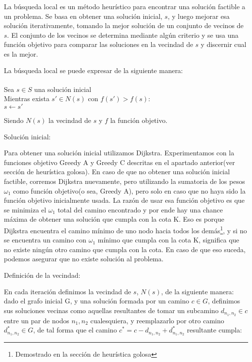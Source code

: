 
La búsqueda local es un método heurístico para encontrar una solución factible a un problema. Se basa en obtener una solución inicial, $s$, y luego mejorar esa solución iterativamente, tomando la mejor solución de un conjunto de vecinos de $s$. El conjunto de los vecinos se determina mediante algún criterio y se usa una función objetivo para comparar las soluciones en la vecindad de $s$ y discernir cual es la mejor.

La búsqueda local se puede expresar de la siguiente manera:\\\\
Sea $s \in S$ una solución inicial\\
Mientras exista $s' \in N(s)$ con $f(s') > f(s)$:\\
\hspace*{1 cm} $s \leftarrow s'$

Siendo $N(s)$ la vecindad de $s$ y $f$ la función objetivo.

Solución inicial:

Para obtener una solución inicial utilizamos Dijkstra. Experimentamos con la funciones objetivo Greedy A y Greedy C descritas en el apartado anterior(ver sección de heurística golosa). En caso de que no obtener una solución inicial factible, corremos Dijkstra nuevamente, pero utilizando la sumatoria de los pesos $\omega_1$ como función objetivo(o sea, Greedy A), pero solo en caso que no haya sido la función objetivo inicialmente usada. La razón de usar esa función objetivo es que se minimiza el $\omega_1$ total del camino encontrado y por ende hay una chance máxima de obtener una solución que cumpla con la cota K. Eso es porque Dijkstra encuentra el camino mínimo de uno nodo hacia todos los demás\footnote{Demostrado en la sección de heurística golosa}, y si no se encuentra un camino con $\omega_1$ mínimo que cumpla con la cota K, significa que no existe ningún otro camino que cumpla con la cota. En caso de que eso suceda, podemos asegurar que no existe solución al problema.

Definición de la vecindad:

En cada iteración definimos la vecindad de $s$, $N(s)$, de la siguiente manera: dado el grafo inicial G, y una solución formada por un camino $c \in G$, definimos sus soluciones vecinas como aquellas resultantes de tomar un subcamino $d_{n_1,n_2} \in c$ entre un par de nodos $n_1,n_2$ cualesquiera, y reemplazarlo por otro camino $d_{n_1,n_2}^* \in G$, de tal forma que el camino $c^* = c - d_{n_1,n_2} + d_{n_1,n_2}^*$ resultante cumpla: 

